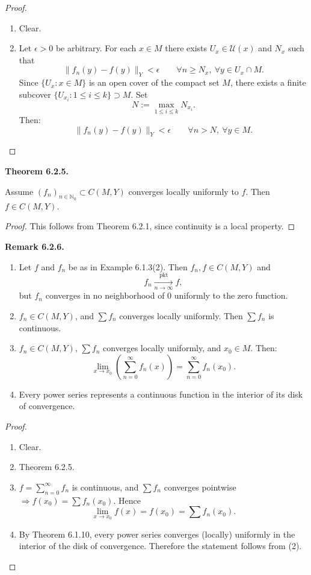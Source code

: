 \documentclass[12pt]{article}
\newenvironment{satz}[1]{%
  \par\vspace{6pt}\noindent\textbf{Theorem #1.}\itshape\space
}{%
  \par\vspace{6pt}
}
\newenvironment{bemerkung}[1]{%
  \par\vspace{6pt}\noindent\textbf{Remark #1.}\itshape\space
}{%
  \par\vspace{6pt}
}
\begin{document}
\begin{proof}
\begin{enumerate}
    \item Clear.
    \item Let $\epsilon>0$ be arbitrary. For each $x\in M$ there exists $U_x\in\mathcal U(x)$ and $N_x$ such that
    \[
    \|f_n(y)-f(y)\|_Y<\epsilon
    \qquad
    \forall n\ge N_x,\ \forall y\in U_x\cap M.
    \]
    Since $\{U_x:x\in M\}$ is an open cover of the compact set $M$, there exists a finite subcover
    $\{U_{x_i}:1\le i\le k\}\supset M$. Set
    \[
    N:=\max_{1\le i\le k}N_{x_i}.
    \]
    Then:
    \[
    \|f_n(y)-f(y)\|_Y<\epsilon
    \qquad
    \forall n>N,\ \forall y\in M.
    \]
\end{enumerate}
\end{proof}

\begin{satz}{6.2.5}
Assume $(f_n)_{n\in\mathbb N_0}\subset C(M,Y)$ converges locally uniformly to $f$.
Then $f\in C(M,Y)$.
\end{satz}

\begin{proof}
This follows from Theorem 6.2.1, since continuity is a local property.
\end{proof}

\begin{bemerkung}{6.2.6}
\hfill
\begin{enumerate}
    \item Let $f$ and $f_n$ be as in Example 6.1.3(2). Then $f_n,f\in C(M,Y)$ and
    \[
    f_n \xrightarrow[n\to\infty]{\mathrm{pkt}} f,
    \]
    but $f_n$ converges in no neighborhood of $0$ uniformly to the zero function.

    \item $f_n\in C(M,Y)$, and $\sum f_n$ converges locally uniformly. Then $\sum f_n$ is continuous.

    \item $f_n\in C(M,Y)$, $\sum f_n$ converges locally uniformly, and $x_0\in M$. Then:
    \[
    \lim_{x\to x_0}\left(\sum_{n=0}^{\infty} f_n(x)\right)=\sum_{n=0}^{\infty} f_n(x_0).
    \]

    \item Every power series represents a continuous function in the interior of its disk of convergence.
\end{enumerate}
\end{bemerkung}

\begin{proof}
\begin{enumerate}
    \item Clear.
    \item Theorem 6.2.5.
    \item $f=\sum_{n=0}^{\infty} f_n$ is continuous, and $\sum f_n$ converges pointwise $\Rightarrow f(x_0)=\sum f_n(x_0)$. Hence
    \[
    \lim_{x\to x_0} f(x)=f(x_0)=\sum f_n(x_0).
    \]
    \item By Theorem 6.1.10, every power series converges (locally) uniformly in the interior of the disk of convergence. Therefore the statement follows from (2).
\end{enumerate}
\end{proof}
\end{document}
